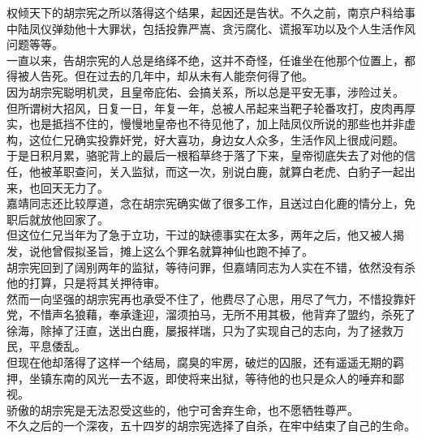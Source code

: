 	\begin{multicols}{\theparacolNo}
\fi
权倾天下的胡宗宪之所以落得这个结果，起因还是告状。不久之前，南京户科给事中陆凤仪弹劾他十大罪状，包括投靠严嵩、贪污腐化、谎报军功以及个人生活作风问题等等。\\

一直以来，告胡宗宪的人总是络绎不绝，这并不奇怪，任谁坐在他那个位置上，都得被人告死。但在过去的几年中，却从未有人能奈何得了他。\\

因为胡宗宪聪明机灵，且皇帝庇佑、会搞关系，所以总是平安无事，涉险过关。\\

但所谓树大招风，日复一日，年复一年，总被人吊起来当靶子轮番攻打，皮肉再厚实，也是抵挡不住的，慢慢地皇帝也不待见他了，加上陆凤仪所说的那些也并非虚构，这位仁兄确实投靠奸党，好大喜功，身边女人众多，生活作风上很成问题。\\

于是日积月累，骆驼背上的最后一根稻草终于落了下来，皇帝彻底失去了对他的信任，他被革职查问，关入监狱，而这一次，别说白鹿，就算白老虎、白豹子一起出来，也回天无力了。\\

嘉靖同志还比较厚道，念在胡宗宪确实做了很多工作，且送过白化鹿的情分上，免职后就放他回家了。\\

但这位仁兄当年为了急于立功，干过的缺德事实在太多，两年之后，他又被人揭发，说他曾假拟圣旨，摊上这么个罪名就算神仙也跑不掉了。\\

胡宗宪回到了阔别两年的监狱，等待问罪，但嘉靖同志为人实在不错，依然没有杀他的打算，只是将其关押待审。\\

然而一向坚强的胡宗宪再也承受不住了，他费尽了心思，用尽了气力，不惜投靠奸党，不惜声名狼藉，奉承逢迎，溜须拍马，无所不用其极，他背弃了盟约，杀死了徐海，除掉了汪直，送出白鹿，屡报祥瑞，只为了实现自己的志向，为了拯救万民，平息倭乱。\\

但现在他却落得了这样一个结局，腐臭的牢房，破烂的囚服，还有遥遥无期的羁押，坐镇东南的风光一去不返，即使将来出狱，等待他的也只是众人的唾弃和鄙视。\\

骄傲的胡宗宪是无法忍受这些的，他宁可舍弃生命，也不愿牺牲尊严。\\

不久之后的一个深夜，五十四岁的胡宗宪选择了自杀，在牢中结束了自己的生命。\\


\end{multicols}
